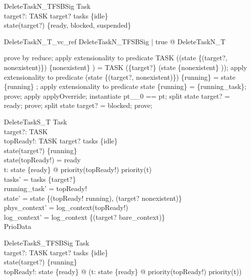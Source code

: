 \documentclass[a4paper, 12pt]{article}
\begin{document}
\begin{schema}{DeleteTaskN\_TFSBSig}
  Task\\
  target?: TASK
\where
  target? \in  tasks \setminus  \{idle\}\\
  state(target?) \in  \{ready, blocked, suspended\}
\end{schema}

\begin{theorem}{DeleteTaskN\_T\_vc\_ref}
\forall  DeleteTaskN\_TFSBSig | true @ \pre  DeleteTaskN\_T
\end{theorem}

\begin{zproof}
prove by reduce;
apply extensionality to predicate TASK \setminus  ((state \oplus  \{(target?, nonexistent)\}) \inv  \limg  \{nonexistent\} \rimg ) = TASK \setminus  (\{target?\} \cup  (state \inv  \limg  \{nonexistent\} \rimg ));
apply extensionality to predicate (state \oplus  \{(target?, nonexistent)\}) \inv  \limg  \{running\} \rimg  = state \inv  \limg  \{running\} \rimg ;
apply extensionality to predicate state \inv  \limg  \{running\} \rimg  = \{running\_task\};
prove;
apply applyOverride;
instantiate pt\_\_0 == pt;
split state target? = ready;
prove;
split state target? = blocked;
prove;
\end{zproof}

\begin{schema}{DeleteTaskS\_T}
  \Delta Task\\
  target?: TASK\\
  topReady!: TASK
\where
  target? \in  tasks \setminus  \{idle\}\\
  state(target?) \in  \{running\}\\
  state(topReady!) = ready\\
  \forall  t: state \inv  \limg  \{ready\} \rimg  @ priority(topReady!) \geq  priority(t)\\
  tasks' = tasks \setminus  \{target?\}\\
  running\_task' = topReady!\\
  state' = state \oplus  \{(topReady! \mapsto  running), (target? \mapsto  nonexistent)\}\\
  phys\_context' = log\_context(topReady!)\\
  log\_context' = log\_context \oplus  \{(target? \mapsto  bare\_context)\}\\
  \Xi PrioData
\end{schema}

\begin{schema}{DeleteTaskS\_TFSBSig}
  Task\\
  target?: TASK
\where
  target? \in  tasks \setminus  \{idle\}\\
  state(target?) \in  \{running\}\\
  \exists  topReady!: state \inv \limg \{ready\} \rimg @ (\forall  t: state \inv  \limg  \{ready\} \rimg  @ priority(topReady!) \geq  priority(t))
\end{schema}
\end{document}
